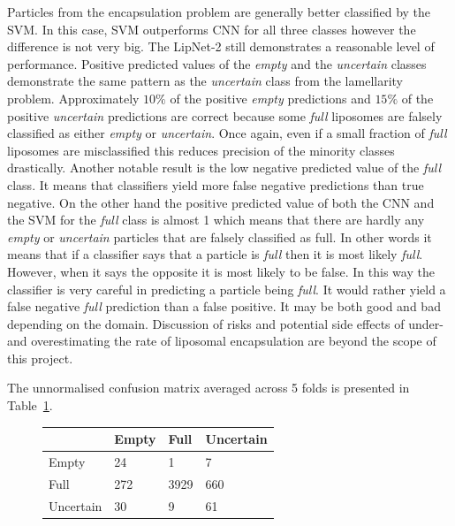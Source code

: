 \documentclass[a4paper, 11pt, table]{article}
\begin{document}
Particles from the encapsulation problem are generally better classified by the SVM. In this case, SVM outperforms CNN for all three classes however the difference is not very big. The LipNet-2 still demonstrates a reasonable level of performance. Positive predicted values of the \textit{empty} and the \textit{uncertain} classes demonstrate the same pattern as the \textit{uncertain} class from the lamellarity problem. Approximately $10\%$ of the positive \textit{empty} predictions and $15\%$ of the positive \textit{uncertain} predictions are correct because some \textit{full} liposomes are falsely classified as either \textit{empty} or \textit{uncertain}. Once again, even if a small fraction of \textit{full} liposomes are misclassified this reduces precision of the minority classes drastically. Another notable result is the low negative predicted value of the \textit{full} class. It means that classifiers yield more false negative predictions than true negative. On the other hand the positive predicted value of both the CNN and the SVM for the \textit{full} class is almost 1 which means that there are hardly any \textit{empty} or \textit{uncertain} particles that are falsely classified as full. In other words it means that if a classifier says that a particle is \textit{full} then it is most likely \textit{full}. However, when it says the opposite it is most likely to be false. In this way the classifier is very careful in predicting a particle being \textit{full}. It would rather yield a false negative \textit{full} prediction than a false positive. It may be both good and bad depending on the domain. Discussion of risks and potential side effects of under- and overestimating the rate of liposomal encapsulation are beyond the scope of this project. 

The unnormalised confusion matrix averaged across 5 folds  is presented in Table~\ref{table:cnn_encapsulation_cf_not_normalized}.     

\begin{figure}[H]
\centering
{}
\label{table:cnn_encapsulation_cf_not_normalized}
\begin{tabular}{|L{2.5cm} |C{2.5cm} |C{2.5cm} |C{2.5cm}|}
\toprule
 & Empty & Full & Uncertain \\
\midrule
Empty & 24 & 1 & 7 \\
Full & 272 & 3929 & 660 \\
Uncertain & 30 & 9 & 61 \\
\bottomrule
\end{tabular}
\end{figure}
\end{document}
